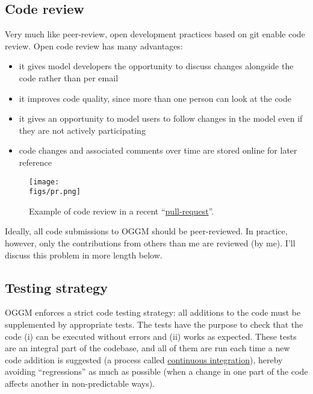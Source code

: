 \subsection{Code review}

Very much like peer-review, open development practices based on git enable code review. Open code review has many
advantages:
\begin{itemize}
\item {} 
it gives model developers the opportunity to discuss changes alongside the code rather than per email

\item {} 
it improves code quality, since more than one person can look at the code

\item {} 
it gives an opportunity to model users to follow changes in the model even if they are not actively participating

\item {} 
code changes and associated comments over time are stored online for later reference

\end{itemize}


\begin{figure}[h]
\centering
\texttt{[image: \\figs/pr.png]}
\caption{Example of code review in a recent “\href{https://github.com/OGGM/oggm/pull/1142}{pull-request}”.}
\end{figure}

Ideally, all code submissions to OGGM should be peer-reviewed. In practice, however, only the contributions from others
than me are reviewed (by me). I’ll discuss this problem in more length below.


\subsection{Testing strategy}

OGGM enforces a strict code testing strategy: all additions to the code must be supplemented by appropriate tests. The
tests have the purpose to check that the code (i) can be executed without errors and (ii) works as expected. These tests
are an integral part of the codebase, and all of them are run each time a new code addition is suggested (a process
called \href{https://en.wikipedia.org/wiki/Continuous\_integration\#Run\_tests\_in\_CI}{continuous integration}), hereby
avoiding “regressions” as much as possible (when a change in one part of the code affects another in non-predictable
ways).

